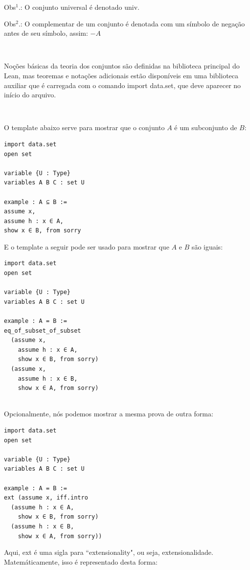 Obs$^{1}$.: O conjunto universal é denotado {
\selectfont univ}.

Obs$^{2}$.: O complementar de um conjunto é denotada com um símbolo de negação antes de seu símbolo, assim: $-A$

$\qquad$

Noções básicas da teoria dos conjuntos são definidas na biblioteca principal do Lean, mas teoremas e notações adicionais estão disponíveis em uma biblioteca auxiliar que é carregada com o comando 
{
\selectfont import data.set}, que deve aparecer no início do arquivo.

$\qquad$

O template abaixo serve para mostrar que o conjunto $A$ é um subconjunto de $B$:

\begin{lstlisting}
import data.set
open set

variable {U : Type}
variables A B C : set U

example : A ⊆ B :=
assume x,
assume h : x ∈ A,
show x ∈ B, from sorry

\end{lstlisting}

E o template a seguir pode ser usado para mostrar que $A$ e $B$ são iguais:

\begin{lstlisting}
import data.set
open set

variable {U : Type}
variables A B C : set U

example : A = B :=
eq_of_subset_of_subset
  (assume x,
    assume h : x ∈ A,
    show x ∈ B, from sorry)
  (assume x,
    assume h : x ∈ B,
    show x ∈ A, from sorry)
    
\end{lstlisting}

Opcionalmente, nós podemos mostrar a mesma prova de outra forma:

\begin{lstlisting}
import data.set
open set

variable {U : Type}
variables A B C : set U

example : A = B :=
ext (assume x, iff.intro
  (assume h : x ∈ A,
    show x ∈ B, from sorry)
  (assume h : x ∈ B,
    show x ∈ A, from sorry))

\end{lstlisting}

Aqui, {
\selectfont ext} é uma sigla para ``extensionality", ou seja, extensionalidade. Matemáticamente, isso é representado desta forma:

